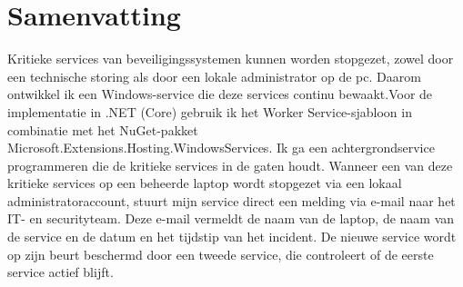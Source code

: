 


\chapter*{Samenvatting}
\label{ch:samenvatting-nl}

Kritieke services van beveiligingssystemen kunnen worden stopgezet, zowel door een technische storing als door een lokale administrator op de pc. Daarom ontwikkel ik een Windows-service die deze services continu bewaakt.Voor de implementatie in .NET (Core) gebruik ik het Worker Service-sjabloon in combinatie met het NuGet-pakket Microsoft.Extensions.Hosting.WindowsServices.
Ik ga een achtergrondservice programmeren die de kritieke services in de gaten houdt. Wanneer een van deze kritieke services op een beheerde laptop wordt stopgezet via een lokaal administratoraccount, stuurt mijn service direct een melding via e-mail naar het IT- en securityteam. Deze e-mail vermeldt de naam van de laptop, de naam van de service en de datum en het tijdstip van het incident.
De nieuwe service wordt op zijn beurt beschermd door een tweede service, die controleert of de eerste service actief blijft.


